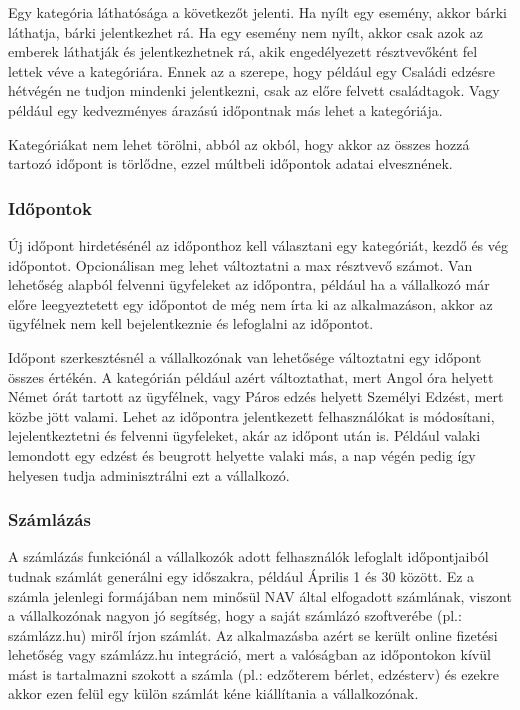 Egy kategória láthatósága a következőt jelenti. Ha nyílt egy esemény, akkor bárki láthatja, bárki jelentkezhet rá. Ha egy esemény nem nyílt, akkor csak azok az emberek láthatják és jelentkezhetnek rá, akik engedélyezett résztvevőként fel lettek véve a kategóriára. Ennek az a szerepe, hogy például egy Családi edzésre hétvégén ne tudjon mindenki jelentkezni, csak az előre felvett családtagok. Vagy például egy kedvezményes árazású időpontnak más lehet a kategóriája.

Kategóriákat nem lehet törölni, abból az okból, hogy akkor az összes hozzá tartozó időpont is törlődne, ezzel múltbeli időpontok adatai elvesznének.

\subsubsection{Időpontok}

Új időpont hirdetésénél az időponthoz kell választani egy kategóriát, kezdő és vég időpontot. Opcionálisan meg lehet változtatni a max résztvevő számot. Van lehetőség alapból felvenni ügyfeleket az időpontra, például ha a vállalkozó már előre leegyeztetett egy időpontot de még nem írta ki az alkalmazáson, akkor az ügyfélnek nem kell bejelentkeznie és lefoglalni az időpontot.

Időpont szerkesztésnél a vállalkozónak van lehetősége változtatni egy időpont összes értékén. A kategórián például azért változtathat, mert Angol óra helyett Német órát tartott az ügyfélnek, vagy Páros edzés helyett Személyi Edzést, mert közbe jött valami. Lehet az időpontra jelentkezett felhasználókat is módosítani, lejelentkeztetni és felvenni ügyfeleket, akár az időpont után is. Például valaki lemondott egy edzést és beugrott helyette valaki más, a nap végén pedig így helyesen tudja adminisztrálni ezt a vállalkozó.

\subsubsection{Számlázás}

A számlázás funkciónál a vállalkozók adott felhasználók lefoglalt időpontjaiból tudnak számlát generálni egy időszakra, például Április 1 és 30 között. Ez a számla jelenlegi formájában nem minősül NAV által elfogadott számlának, viszont a vállalkozónak nagyon jó segítség, hogy a saját számlázó szoftverébe (pl.: számlázz.hu) miről írjon számlát. Az alkalmazásba azért se került online fizetési lehetőség vagy számlázz.hu integráció, mert a valóságban az időpontokon kívül mást is tartalmazni szokott a számla (pl.: edzőterem bérlet, edzésterv) és ezekre akkor ezen felül egy külön számlát kéne kiállítania a vállalkozónak.


